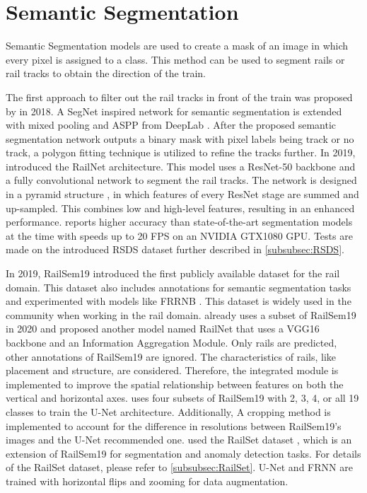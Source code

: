 \section{Semantic Segmentation}
\label{sec:SemanticSegmentation}

Semantic Segmentation models are used to create a mask of an image in which every pixel is assigned to a class.
This method can be used to segment rails or rail tracks to obtain the direction of the train.

The first approach to filter out the rail tracks in front of the train was proposed by \cite{firstRailSegmentation2018} in 2018.
A SegNet \cite{SegNet2017} inspired network for semantic segmentation is extended with mixed pooling \cite{mixedPooling2014} and \ac{ASPP} from DeepLab \cite{deepLab2018}.
After the proposed semantic segmentation network outputs a binary mask with pixel labels being track or no track, a polygon fitting technique is utilized to refine the tracks further.
In 2019, \cite{railNet2019} introduced the RailNet architecture.
This model uses a ResNet-50 \cite{ResNet} backbone and a fully convolutional network \cite{FullyConvolutionalNetworks2015} to segment the rail tracks.
The network is designed in a pyramid structure \cite{FPN2017_two_stage-detector}, in which features of every ResNet stage are summed and up-sampled.
This combines low and high-level features, resulting in an enhanced performance.
\cite{railNet2019} reports higher accuracy than state-of-the-art segmentation models at the time with speeds up to 20 \ac{FPS} on an NVIDIA GTX1080 GPU.
Tests are made on the introduced \ac{RSDS} dataset further described in \autoref{subsubsec:RSDS}.

In 2019, RailSem19 \cite{railsem19dataset} introduced the first publicly available dataset for the rail domain.
This dataset also includes annotations for semantic segmentation tasks and experimented with models like FRRNB \cite{FRRNBModel2017}.
This dataset is widely used in the community when working in the rail domain.
\cite{RailNet2020} already uses a subset of RailSem19 in 2020 and proposed another model named RailNet that uses a VGG16 \cite{VGGNet2015} backbone and an Information Aggregation Module.
Only rails are predicted, other annotations of RailSem19 are ignored.
The characteristics of rails, like placement and structure, are considered.
Therefore, the integrated module is implemented to improve the spatial relationship between features on both the vertical and horizontal axes.
\cite{automatedSemSeg2022} uses four subsets of RailSem19 with 2, 3, 4, or all 19 classes to train the U-Net \cite{uNet2015} architecture.
Additionally, A cropping method is implemented to account for the difference in resolutions between RailSem19's images and the U-Net recommended one.
\cite{hadded2022application} used the RailSet dataset \cite{railSet2022}, which is an extension of RailSem19 for segmentation and anomaly detection tasks.
For details of the RailSet dataset, please refer to \autoref{subsubsec:RailSet}.
U-Net \cite{uNet2015} and FRNN \cite{FRRNBModel2017} are trained with horizontal flips and zooming for data augmentation.

